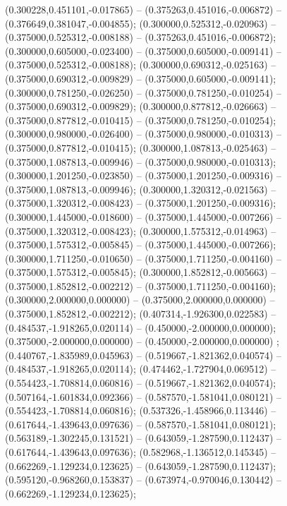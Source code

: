  (0.300228,0.451101,-0.017865) -- (0.375263,0.451016,-0.006872) -- (0.376649,0.381047,-0.004855);
 (0.300000,0.525312,-0.020963) -- (0.375000,0.525312,-0.008188) -- (0.375263,0.451016,-0.006872);
 (0.300000,0.605000,-0.023400) -- (0.375000,0.605000,-0.009141) -- (0.375000,0.525312,-0.008188);
 (0.300000,0.690312,-0.025163) -- (0.375000,0.690312,-0.009829) -- (0.375000,0.605000,-0.009141);
 (0.300000,0.781250,-0.026250) -- (0.375000,0.781250,-0.010254) -- (0.375000,0.690312,-0.009829);
 (0.300000,0.877812,-0.026663) -- (0.375000,0.877812,-0.010415) -- (0.375000,0.781250,-0.010254);
 (0.300000,0.980000,-0.026400) -- (0.375000,0.980000,-0.010313) -- (0.375000,0.877812,-0.010415);
 (0.300000,1.087813,-0.025463) -- (0.375000,1.087813,-0.009946) -- (0.375000,0.980000,-0.010313);
 (0.300000,1.201250,-0.023850) -- (0.375000,1.201250,-0.009316) -- (0.375000,1.087813,-0.009946);
 (0.300000,1.320312,-0.021563) -- (0.375000,1.320312,-0.008423) -- (0.375000,1.201250,-0.009316);
 (0.300000,1.445000,-0.018600) -- (0.375000,1.445000,-0.007266) -- (0.375000,1.320312,-0.008423);
 (0.300000,1.575312,-0.014963) -- (0.375000,1.575312,-0.005845) -- (0.375000,1.445000,-0.007266);
 (0.300000,1.711250,-0.010650) -- (0.375000,1.711250,-0.004160) -- (0.375000,1.575312,-0.005845);
 (0.300000,1.852812,-0.005663) -- (0.375000,1.852812,-0.002212) -- (0.375000,1.711250,-0.004160);
 (0.300000,2.000000,0.000000) -- (0.375000,2.000000,0.000000) -- (0.375000,1.852812,-0.002212);
 (0.407314,-1.926300,0.022583) -- (0.484537,-1.918265,0.020114) -- (0.450000,-2.000000,0.000000);
 (0.375000,-2.000000,0.000000) -- (0.450000,-2.000000,0.000000) ;
 (0.440767,-1.835989,0.045963) -- (0.519667,-1.821362,0.040574) -- (0.484537,-1.918265,0.020114);
 (0.474462,-1.727904,0.069512) -- (0.554423,-1.708814,0.060816) -- (0.519667,-1.821362,0.040574);
 (0.507164,-1.601834,0.092366) -- (0.587570,-1.581041,0.080121) -- (0.554423,-1.708814,0.060816);
 (0.537326,-1.458966,0.113446) -- (0.617644,-1.439643,0.097636) -- (0.587570,-1.581041,0.080121);
 (0.563189,-1.302245,0.131521) -- (0.643059,-1.287590,0.112437) -- (0.617644,-1.439643,0.097636);
 (0.582968,-1.136512,0.145345) -- (0.662269,-1.129234,0.123625) -- (0.643059,-1.287590,0.112437);
 (0.595120,-0.968260,0.153837) -- (0.673974,-0.970046,0.130442) -- (0.662269,-1.129234,0.123625);

